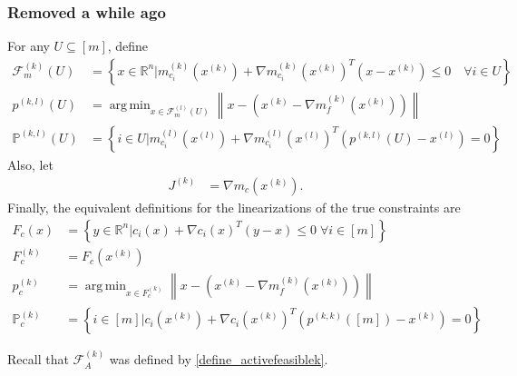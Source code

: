 \documentclass{article}
\theoremstyle{case}
\numberwithin{theorem}{subsection}
\DeclareMathOperator*{\argmin}{arg\,min}
\newcommand{\feasiblek}{{\mathcal F_m^{(k)}}}
\newcommand{\feasiblel}{{\mathcal F_m^{(l)}}}
\newcommand{\gk}{{\nabla m_f^{(k)}\left(\xk\right)}}
\newcommand{\gmcik}{{\nabla m_{c_i}^{(k)}\left(\xk\right)}}
\newcommand{\gmcil}{{\nabla m_{c_i}^{(l)}\left(\xl\right)}}
\newcommand{\mcik}{{{m}^{(k)}_{c_i}}}
\newcommand{\mcil}{{{m}^{(l)}_{c_i}}}
\newcommand{\Rn}{\mathbb R^n}
\newcommand{\xk}{x^{(k)}}
\newcommand{\xl}{{x^{(l)}}}
\newcommand{\activefeasiblek}{{\mathcal F^{(k)}_A}}
\newcommand{\projkl}{{p^{(k,l)}}}
\newcommand{\projkk}{{p^{(k,k)}}}
\newcommand{\trueprojk}{{p_c^{(k)}}}
\newcommand{\truefeasiblek}{{F_c^{(k)}}}
\newcommand{\truefeasible}{{F_c}}
\newcommand{\trueactiveprojk}{{\mathbb P_c^{(k)}}}
\newcommand{\activeprojkl}{{\mathbb P^{(k, l)}}}
\newcommand{\jackk}{{J^{(k)}}}
\begin{document}
\subsubsection{Removed a while ago}



For any $U \subseteq [m]$, define
\begin{align}
\feasiblek(U) &=  \left\{ x \in \Rn \bigg| \mcik\left(\xk\right) + \gmcik^T \left(x - \xk\right) \le 0 \quad \forall i \in U \right\} \label{sha_fks} \\
\projkl(U) &= \argmin_{x \in \feasiblel(U)} \left\|x - \left(\xk - \gk\right)\right\| \label{sha_projkl} \\
\activeprojkl\left(U\right) &= \left\{ i \in U \bigg| \mcil\left(\xl\right) + \gmcil^T \left(\projkl(U) - \xl\right) = 0 \right\} \label{sha_proj_indices}
\end{align}
Also, let
\begin{align}
\jackk &= \nabla m_c\left(\xk\right) \label{sha_jacobian}.
\end{align}
Finally, the equivalent definitions for the linearizations of the true constraints are
\begin{align}
\truefeasible \left(x\right) &=  \left\{ y \in \Rn \bigg| c_i\left(x\right) + \nabla c_i\left(x\right)^T \left(y - x\right) \le 0 \; \forall i \in [m] \right\} \label{sha_truef} \\
\truefeasiblek &=  \truefeasible\left(\xk\right) \label{sha_truefk} \\
\trueprojk &= \argmin_{x \in \truefeasiblek} \left\|x - \left(\xk - \gk\right)\right\| \label{sha_trueproj} \\
\trueactiveprojk &= \left\{ i \in [m] \bigg| c_i\left(\xk\right) + \nabla c_i\left(\xk\right)^T \left(\projkk([m]) - \xk\right) = 0 \right\} \label{sha_true_proj_indices}
\end{align}





Recall that $\activefeasiblek$ was defined by \cref{define_activefeasiblek}.
\end{document}
